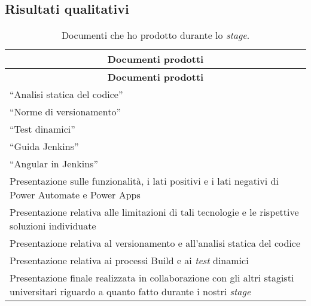 \subsection{Risultati qualitativi}
\begingroup
\renewcommand\arraystretch{1.3}
\begin{longtable}{|p{11cm}|}
    \caption{Documenti che ho prodotto durante lo \emph{stage}.}
    \label{tab:risultatiQualitativi}\\
    \hline \multicolumn{1}{|c|}{\textbf{Documenti prodotti}}\\ \hline \endfirsthead
    \hline \multicolumn{1}{|c|}{\textbf{Documenti prodotti}}\\ \hline \endhead
    \hline \endhead
    \hline \endfoot
    \hline \endlastfoot
    \hline “Analisi statica del codice”\\
    \hline “Norme di versionamento”\\
    \hline “Test dinamici”\\
    \hline “Guida Jenkins”\\
    \hline “Angular in Jenkins”\\
    \hline Presentazione sulle funzionalità, i lati positivi e i lati negativi di Power Automate e Power Apps\\
    \hline Presentazione relativa alle limitazioni di tali tecnologie e le rispettive soluzioni individuate\\
    \hline Presentazione relativa al versionamento e all'analisi statica del codice\\
    \hline Presentazione relativa ai processi Build e ai \emph{test} dinamici\\
    \hline Presentazione finale realizzata in collaborazione con gli altri stagisti universitari riguardo a quanto fatto durante i nostri \emph{stage}\\
\end{longtable}
\endgroup
 
